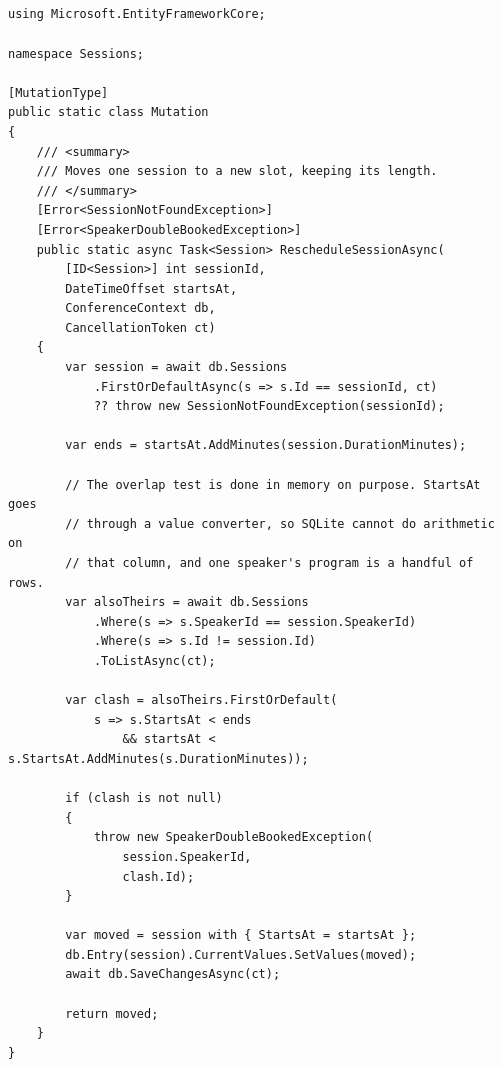 \subsection*{}
\begin{verbatim}
using Microsoft.EntityFrameworkCore;

namespace Sessions;

[MutationType]
public static class Mutation
{
    /// <summary>
    /// Moves one session to a new slot, keeping its length.
    /// </summary>
    [Error<SessionNotFoundException>]
    [Error<SpeakerDoubleBookedException>]
    public static async Task<Session> RescheduleSessionAsync(
        [ID<Session>] int sessionId,
        DateTimeOffset startsAt,
        ConferenceContext db,
        CancellationToken ct)
    {
        var session = await db.Sessions
            .FirstOrDefaultAsync(s => s.Id == sessionId, ct)
            ?? throw new SessionNotFoundException(sessionId);

        var ends = startsAt.AddMinutes(session.DurationMinutes);

        // The overlap test is done in memory on purpose. StartsAt goes
        // through a value converter, so SQLite cannot do arithmetic on
        // that column, and one speaker's program is a handful of rows.
        var alsoTheirs = await db.Sessions
            .Where(s => s.SpeakerId == session.SpeakerId)
            .Where(s => s.Id != session.Id)
            .ToListAsync(ct);

        var clash = alsoTheirs.FirstOrDefault(
            s => s.StartsAt < ends
                && startsAt < s.StartsAt.AddMinutes(s.DurationMinutes));

        if (clash is not null)
        {
            throw new SpeakerDoubleBookedException(
                session.SpeakerId,
                clash.Id);
        }

        var moved = session with { StartsAt = startsAt };
        db.Entry(session).CurrentValues.SetValues(moved);
        await db.SaveChangesAsync(ct);

        return moved;
    }
}
\end{verbatim}

